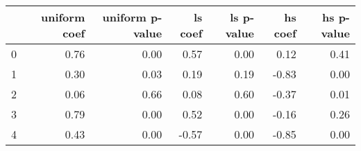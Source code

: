 \begin{tabular}{lrrrrrr}
\toprule
 & uniform coef & uniform p-value & ls coef & ls p-value & hs coef & hs p-value \\
\midrule
0 & 0.76 & 0.00 & 0.57 & 0.00 & 0.12 & 0.41 \\
1 & 0.30 & 0.03 & 0.19 & 0.19 & -0.83 & 0.00 \\
2 & 0.06 & 0.66 & 0.08 & 0.60 & -0.37 & 0.01 \\
3 & 0.79 & 0.00 & 0.52 & 0.00 & -0.16 & 0.26 \\
4 & 0.43 & 0.00 & -0.57 & 0.00 & -0.85 & 0.00 \\
\bottomrule
\end{tabular}
